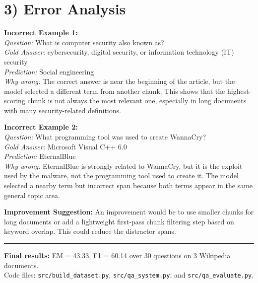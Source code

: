\documentclass[10pt,a4paper]{article}
\begin{document}
\section*{3) Error Analysis}

\noindent\textbf{Incorrect Example 1:}\\
\textit{Question:} What is computer security also known as?\\
\textit{Gold Answer:} cybersecurity, digital security, or information technology (IT) security\\
\textit{Prediction:} Social engineering\\
\textit{Why wrong:} The correct answer is near the beginning of the article, but the model selected a different term from another chunk. This shows that the highest-scoring chunk is not always the most relevant one, especially in long documents with many security-related definitions.

\vspace{4pt}

\noindent\textbf{Incorrect Example 2:}\\
\textit{Question:} What programming tool was used to create WannaCry?\\
\textit{Gold Answer:} Microsoft Visual C++ 6.0\\
\textit{Prediction:} EternalBlue\\
\textit{Why wrong:} EternalBlue is strongly related to WannaCry, but it is the exploit used by the malware, not the programming tool used to create it. The model selected a nearby term but incorrect span because both terms appear in the same general topic area.

\vspace{4pt}

\noindent\textbf{Improvement Suggestion:} An improvement would be to use smaller chunks for long documents or add a lightweight first-pass chunk filtering step based on keyword overlap. This could reduce the distractor spans.
\vspace{4pt}
\hrule
\vspace{2pt}
{\footnotesize
\textbf{Final results:} EM = 43.33, F1 = 60.14 over 30 questions on 3 Wikipedia documents. \\
Code files: \texttt{src/build\_dataset.py}, \texttt{src/qa\_system.py}, and \texttt{src/qa\_evaluate.py}.
}
\end{document}
